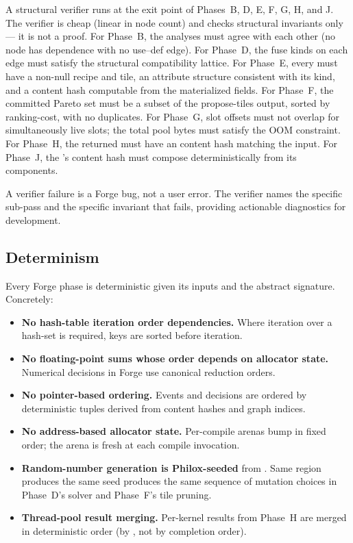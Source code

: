 A structural verifier runs at the exit point of Phases~B, D, E, F, G, H, and J.
The verifier is cheap (linear in node count) and checks structural invariants only --- it is not a proof.
For Phase~B, the analyses must agree with each other (no node has dependence with no use--def edge).
For Phase~D, the fuse kinds on each edge must satisfy the structural compatibility lattice.
For Phase~E, every  must have a non-null recipe and tile, an attribute structure consistent with its kind, and a content hash computable from the materialized fields.
For Phase~F, the committed Pareto set must be a subset of the propose-tiles output, sorted by ranking-cost, with no duplicates.
For Phase~G, slot offsets must not overlap for simultaneously live slots; the total pool bytes must satisfy the OOM constraint.
For Phase~H, the returned  must have an  content hash matching the input.
For Phase~J, the 's content hash must compose deterministically from its components.

A verifier failure is a Forge bug, not a user error.
The verifier names the specific sub-pass and the specific invariant that fails, providing actionable diagnostics for development.

\subsection{Determinism}
\label{sec:forge-determinism}

Every Forge phase is deterministic given its inputs and the abstract  signature.
Concretely:

\begin{itemize}
  \item \textbf{No hash-table iteration order dependencies.} Where iteration over a hash-set is required, keys are sorted before iteration.
  \item \textbf{No floating-point sums whose order depends on allocator state.} Numerical decisions in Forge use canonical reduction orders.
  \item \textbf{No pointer-based ordering.} Events and decisions are ordered by deterministic tuples derived from content hashes and graph indices.
  \item \textbf{No address-based allocator state.} Per-compile arenas bump in fixed order; the arena is fresh at each compile invocation.
  \item \textbf{Random-number generation is Philox-seeded} from .
        Same region produces the same seed produces the same sequence of mutation choices in Phase~D's solver and Phase~F's tile pruning.
  \item \textbf{Thread-pool result merging.} Per-kernel results from Phase~H are merged in deterministic order (by , not by completion order).
\end{itemize}

